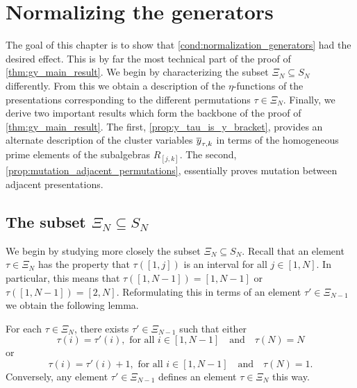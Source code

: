 \section{Normalizing the generators}\label{sec:normalizing_generators}

The goal of this chapter is to show that \cref{cond:normalization_generators} had the
desired effect. This is by far the most technical part of the proof of
\cref{thm:gy_main_result}. We begin by characterizing the subset $\Xi_N \subseteq S_N$
differently. From this we obtain a description of the $\eta$-functions of the
presentations corresponding to the different permutations $\tau \in \Xi_N$. Finally, we
derive two important results which form the backbone of the proof of
\cref{thm:gy_main_result}. The first, \cref{prop:y_tau_is_y_bracket}, provides an
alternate description of the cluster variables $\overline{y}_{\tau, k}$ in terms of the
homogeneous prime elements of the subalgebras $R_{[j, k]}$. The second,
\cref{prop:mutation_adjacent_permutations}, essentially proves mutation between
adjacent presentations.

\subsection{The subset $\Xi_N \subseteq S_N$}

We begin by studying more closely the subset $\Xi_N \subseteq S_N$. Recall that an
element $\tau \in \Xi_N$ has the property that $\tau([1, j])$ is an interval for all $j
	\in [1, N]$. In particular, this means that $\tau([1, N-1]) = [1, N-1]$ or $\tau([1,
		N-1]) = [2, N]$. Reformulating this in terms of an element $\tau' \in \Xi_{N-1}$ we
obtain the following lemma.
\begin{lemma}
	For each $\tau \in \Xi_N$, there exists $\tau' \in \Xi_{N-1}$ such that either
	\begin{equation*}
		\tau(i) = \tau'(i), \text{ for all } i \in [1, N-1] \quad \text{and} \quad \tau(N) = N
	\end{equation*}
	or
	\begin{equation*}
		\tau(i) = \tau'(i) + 1, \text{ for all } i \in [1, N-1] \quad \text{and} \quad \tau(N) = 1.
	\end{equation*}
	Conversely, any element $\tau' \in \Xi_{N-1}$ defines an element $\tau \in \Xi_N$ this
	way.
\end{lemma}

